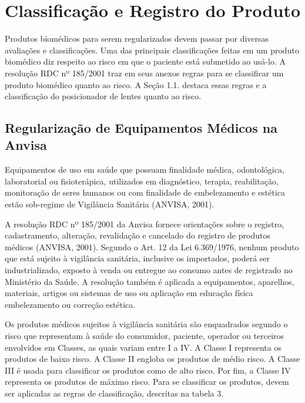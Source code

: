 
\chapter[Classificação e Registro do Produto]{Classificação e Registro do Produto}

Produtos biomédicos para serem regularizados devem passar por diversas avaliações e classificações. Uma das principais classificações feitas em um produto biomédico diz respeito ao risco em que o paciente está submetido ao usá-lo. A resolução RDC nº 185/2001 traz em seus anexos regras para se classificar um produto biomédico quanto ao risco. A Seção 1.1. destaca essas regras e a classificação do posicionador de lentes quanto ao risco.


\section[Regularização de Equipamentos Médicos na Anvisa]{Regularização de Equipamentos Médicos na Anvisa}

Equipamentos de uso em saúde que possuam finalidade médica, odontológica, laboratorial ou fisioterápica, utilizados em diagnóstico, terapia, reabilitação, monitoração de seres humanos ou com finalidade de embelezamento e estética estão sob-regime de Vigilância Sanitária (ANVISA, 2001).
	
A resolução RDC nº 185/2001 da Anvisa fornece orientações sobre o registro, cadastramento, alteração, revalidação e cancelado do registro de produtos médicos (ANVISA, 2001). Segundo o Art. 12 da Lei 6.369/1976, nenhum produto que está sujeito à vigilância sanitária, inclusive os importados, poderá ser industrializado, exposto à venda ou entregue ao consumo antes de registrado no Ministério da Saúde. A resolução também é aplicada a equipamentos, aparelhos, materiais, artigos ou sistemas de uso ou aplicação em educação física embelezamento ou correção estética.

Os produtos médicos sujeitos à vigilância sanitária são enquadrados segundo o risco que representam à saúde do consumidor, paciente, operador ou terceiros envolvidos em Classes, as quais variam entre I a IV. A Classe I representa os produtos de baixo risco. A Classe II engloba os produtos de médio risco. A Classe III é usada para classificar os produtos como de alto risco. Por fim, a Classe IV representa os produtos de máximo risco. Para se classificar os produtos, devem ser aplicadas as regras de classificação, descritas na tabela 3.

\vspace{\onelineskip} 
 \vspace{\onelineskip}
\vspace{\onelineskip} 
 \vspace{\onelineskip}
\vspace{\onelineskip} 
 \vspace{\onelineskip}
\vspace{\onelineskip} 
 \vspace{\onelineskip}
\vspace{\onelineskip} 

